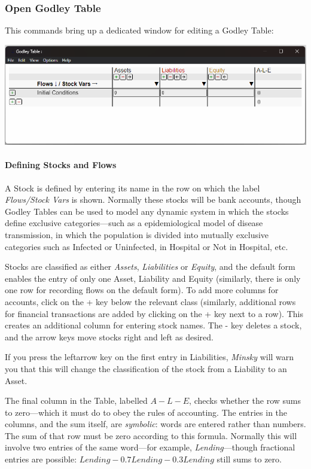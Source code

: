 \subsubsection{Open Godley Table}

This commands bring up a dedicated window for editing a Godley Table:

\noindent\includegraphics[width=\textwidth]{images/GodleyTableEditWindow}

\paragraph{Defining Stocks and Flows}

A Stock is defined by entering its name in the row on which the label
\emph{Flows\textdownarrow /Stock Vars\textrightarrow{}} is shown.
Normally these stocks will be bank accounts, though Godley Tables
can be used to model any dynamic system in which the stocks define
exclusive categories---such as a epidemiological model of disease
transmission, in which the population is divided into mutually exclusive
categories such as Infected or Uninfected, in Hospital or Not in Hospital,
etc.

Stocks are classified as either \emph{Assets}, \emph{Liabilities }or
\emph{Equity}, and the default form enables the entry of only one
Asset, Liability and Equity (similarly, there is only one row for
recording flows on the default form). To add more columns for accounts,
click on the + key below the relevant class (similarly, additional
rows for financial transactions are added by clicking on the + key
next to a row). This creates an additional column for entering stock
names. The - key deletes a stock, and the arrow keys move stocks right
and left as desired. 

If you press the leftarrow key on the first entry in Liabilities,
\emph{Minsky} will warn you that this will change the classification
of the stock from a Liability to an Asset.

The final column in the Table, labelled $A-L-E$, checks whether the
row sums to zero---which it must do to obey the rules of accounting.
The entries in the columns, and the sum itself, are \emph{symbolic}:
words are entered rather than numbers. The sum of that row must be
zero according to this formula. Normally this will involve two entries
of the same word---for example, \emph{Lending}---though fractional
entries are possible: $Lending-0.7Lending-0.3Lending$ still sums
to zero.

